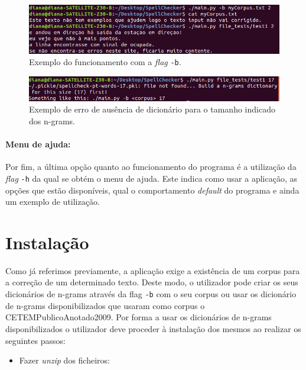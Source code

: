 \documentclass{article}
\begin{document}
\begin{figure}[H]
\begin{center}
    \includegraphics[width = 16cm, keepaspectratio]{Pictures/b.png}
    \caption{Exemplo do funcionamento com a \textit{flag} \texttt{-b}. }
\end{center}
\end{figure}

\begin{figure}[H]
\begin{center}
    \includegraphics[width = 16cm, keepaspectratio]{Pictures/erro.png}
    \caption{Exemplo de erro de ausência de dicionário para o tamanho indicado dos n-grams. }
\end{center}
\end{figure}

\paragraph{Menu de ajuda:} Por fim, a última opção quanto ao funcionamento do programa é a utilização da \textit{flag} \texttt{-h} da qual se obtém o menu de ajuda. Este indica como usar a aplicação, as opções que estão disponíveis, qual o comportamento \textit{default} do programa e ainda um exemplo de utilização. 

\section{Instalação}

Como já referimos previamente, a aplicação exige a existência de um corpus para a correção de um determinado texto. Deste modo, o utilizador pode criar os seus dicionários de n-grams através da flag \texttt{-b} com o seu corpus ou usar os dicionário de n-grams disponibilizados que usaram como corpus o CETEMPublicoAnotado2009. Por forma a usar os dicionários de n-grams disponibilizados o utilizador deve proceder à instalação dos mesmos ao realizar os seguintes passos:

\begin{itemize}
    \item Fazer \textit{unzip} dos ficheiros:
\end{itemize}
\end{document}
